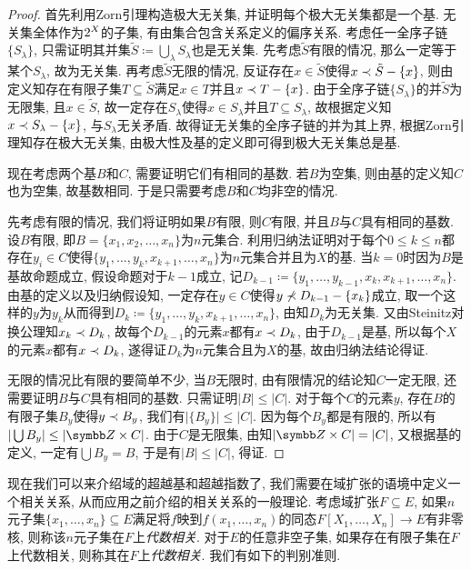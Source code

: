 \begin{proof}
  首先利用Zorn引理构造极大无关集, 并证明每个极大无关集都是一个基. 无关集全体作为$2^{X}$的子集, 有由集合包含关系定义的偏序关系. 考虑任一全序子链$\{S_\lambda\}$, 只需证明其并集$\tilde{S}\coloneq \bigcup_\lambda S_\lambda$也是无关集. 先考虑$\tilde{S}$有限的情况, 那么一定等于某个$S_\lambda$, 故为无关集. 再考虑$\tilde{S}$无限的情况, 反证存在$x\in \tilde{S}$使得$x\prec \tilde{S}-\{x\}$, 则由定义知存在有限子集$T\subseteq\tilde{S}$满足$x\in T$并且$x\prec T-\{x\}$. 由于全序子链$\{S_\lambda\}$的并$\tilde{S}$为无限集, 且$x\in \tilde{S}$, 故一定存在$S_\lambda$使得$x\in S_\lambda$并且$T\subseteq S_\lambda$, 故根据定义知$x\prec S_\lambda-\{x\}$, 与$S_\lambda$无关矛盾. 故得证无关集的全序子链的并为其上界, 根据Zorn引理知存在极大无关集, 由极大性及基的定义即可得到极大无关集总是基.

  现在考虑两个基$B$和$C$, 需要证明它们有相同的基数. 若$B$为空集, 则由基的定义知$C$也为空集, 故基数相同. 于是只需要考虑$B$和$C$均非空的情况.

  先考虑有限的情况, 我们将证明如果$B$有限, 则$C$有限, 并且$B$与$C$具有相同的基数. 设$B$有限, 即$B=\{x_1, x_2, \dotsc, x_n\}$为$n$元集合. 利用归纳法证明对于每个$0\leq k\leq n$都存在$y_i\in C$使得$\{y_1, \dotsc, y_k, x_{k+1}, \dotsc, x_n\}$为$n$元集合并且为$X$的基. 当$k=0$时因为$B$是基故命题成立, 假设命题对于$k-1$成立, 记$D_{k-1}\coloneq \{y_1, \dotsc, y_{k-1}, x_k, x_{k+1}, \dotsc, x_n\}$. 由基的定义以及归纳假设知, 一定存在$y\in C$使得$y\nprec D_{k-1}-\{x_k\}$成立, 取一个这样的$y$为$y_k$从而得到$D_k\coloneq \{y_1, \dotsc, y_k, x_{k+1}, \dotsc, x_n\}$, 由知$D_k$为无关集. 又由Steinitz对换公理知$x_k\prec D_k$, 故每个$D_{k-1}$的元素$x$都有$x\prec D_k$, 由于$D_{k-1}$是基, 所以每个$X$的元素$x$都有$x\prec D_{k}$, 遂得证$D_k$为$n$元集合且为$X$的基, 故由归纳法结论得证.

  无限的情况比有限的要简单不少, 当$B$无限时, 由有限情况的结论知$C$一定无限, 还需要证明$B$与$C$具有相同的基数. 只需证明$\vert B\vert\leq \vert C\vert$. 对于每个$C$的元素$y$, 存在$B$的有限子集$B_y$使得$y\prec B_y$, 我们有$\vert \{B_y\}\vert\leq \vert C\vert$. 因为每个$B_y$都是有限的, 所以有$\vert\bigcup B_y\vert\leq \vert\ZZ\times C\vert$. 由于$C$是无限集, 由知$\vert\ZZ\times C\vert=\vert C\vert$, 又根据基的定义, 一定有$\bigcup B_y=B$, 于是有$\vert B\vert\leq\vert C\vert$, 得证.
\end{proof}

现在我们可以来介绍域的超越基和超越指数了, 我们需要在域扩张的语境中定义一个相关关系, 从而应用之前介绍的相关关系的一般理论. 考虑域扩张$F\subseteq E$, 如果$n$元子集$\{x_1, \dotsc, x_n\}\subseteq E$满足将$f$映到$f(x_1, \dotsc, x_n)$的同态$F[X_1, \dotsc, X_n]\to E$有非零核, 则称该$n$元子集在$F$上\emph{代数相关}. 对于$E$的任意非空子集, 如果存在有限子集在$F$上代数相关, 则称其在$F$上\emph{代数相关}. 我们有如下的判别准则.

